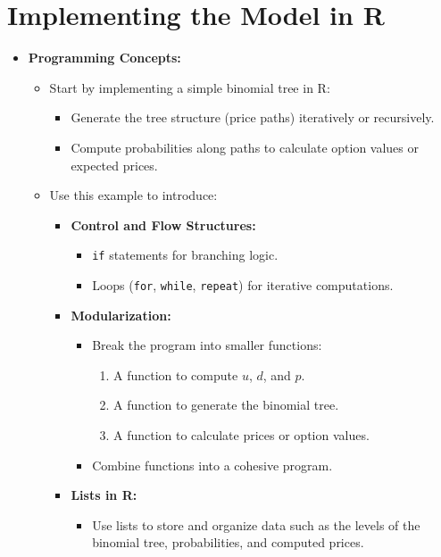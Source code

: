 \documentclass[12pt]{article}
\begin{document}
	\section*{Implementing the Model in R}
	\begin{itemize}
		\item \textbf{Programming Concepts:}
		\begin{itemize}
			\item Start by implementing a simple binomial tree in R:
			\begin{itemize}
				\item Generate the tree structure (price paths) iteratively or recursively.
				\item Compute probabilities along paths to calculate option values or expected prices.
			\end{itemize}
			\item Use this example to introduce:
			\begin{itemize}
				\item \textbf{Control and Flow Structures:}
				\begin{itemize}
					\item \texttt{if} statements for branching logic.
					\item Loops (\texttt{for}, \texttt{while}, \texttt{repeat}) for iterative computations.
				\end{itemize}
				\item \textbf{Modularization:}
				\begin{itemize}
					\item Break the program into smaller functions:
					\begin{enumerate}
						\item A function to compute $u$, $d$, and $p$.
						\item A function to generate the binomial tree.
						\item A function to calculate prices or option values.
					\end{enumerate}
					\item Combine functions into a cohesive program.
				\end{itemize}
				\item \textbf{Lists in R:}
				\begin{itemize}
					\item Use lists to store and organize data such as the levels of the binomial tree, probabilities, and computed prices.
				\end{itemize}
			\end{itemize}

\end{itemize}
\end{itemize}
\end{document}
